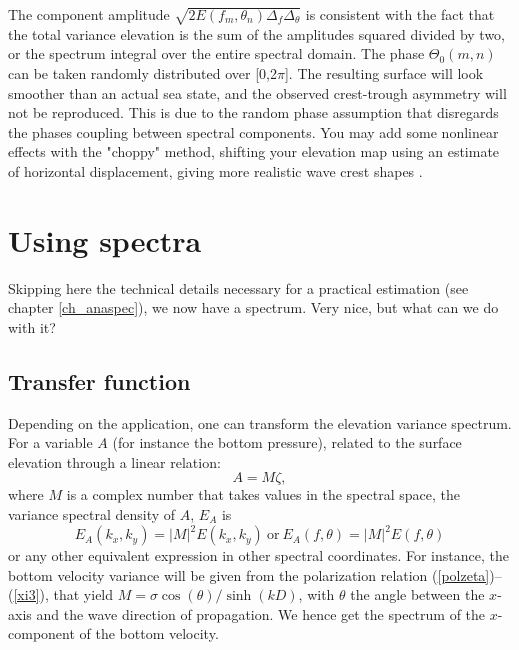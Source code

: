 The component amplitude $\sqrt{2E(f_m,\theta_n)\Delta_f \Delta_\theta}$  is consistent with the fact that the total variance 
elevation is the sum of the amplitudes squared divided by two, or the spectrum integral over the entire spectral domain. 
The phase $\Theta_0(m,n)$ can be taken randomly distributed over [0,2$\pi$]. The resulting surface will look smoother than 
an actual sea state, and the observed crest-trough asymmetry will not be reproduced. This is due to the random phase assumption 
that disregards the phases coupling between spectral components. You may add some nonlinear effects with the "choppy" method, shifting your elevation map using an estimate of horizontal displacement, giving more realistic wave crest shapes \citep{Nouguier&al.2009}.  %

\section{Using spectra}
Skipping here the technical details necessary for a practical estimation (see chapter \ref{ch_anaspec}), we now have a spectrum. Very nice, but what 
can we do with it? 

\subsection{Transfer function}\label{sub:transfer}
Depending on the application, one can transform the elevation variance spectrum. For a variable $A$ (for instance the bottom pressure), related to the  
surface elevation through a linear relation:
\begin{equation}
A=M\zeta,
\label{eq3.12}
\end{equation}
where $M$ is a complex number that takes values in the spectral space, the variance spectral density of $A$, $E_A$ is 
\begin{equation}
E_{A}(k_{x},k_{y})=|M|^{2}E(k_{x},k_{y})~\mathrm{or}~ E_{A}(f,\theta)=|M|^{2}E(f,\theta)
\label{eq:transfert}
\end{equation}
or any other equivalent expression in other spectral coordinates. For instance, the bottom velocity variance will be given from the polarization relation (\ref{polzeta})--(\ref{xi3}), that yield 
$M=\sigma \cos(\theta)/\sinh(kD)$, with $\theta$ the angle between the $x$-axis and the wave direction of propagation. We hence 
get the spectrum of the $x$-component of the bottom velocity.

